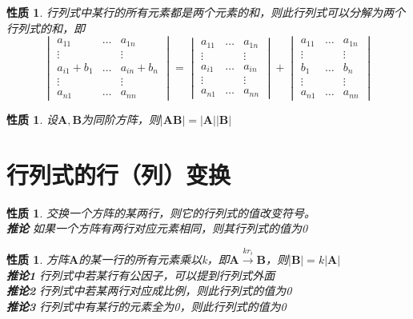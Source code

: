 \documentclass[12pt,oneside]{ctexbook}
\newtheorem{property}[subsection]{性质}
\begin{document}
\begin{property}
    行列式中某行的所有元素都是两个元素的和，则此行列式可以分解为两个行列式的和，即
    \[\begin{vmatrix}
        a_{11}&\dots&a_{1n}
        \\\vdots&&\vdots
        \\a_{i1}+b_1&\dots&a_{in}+b_n
        \\\vdots&&\vdots
        \\a_{n1}&\dots&a_{nn}
    \end{vmatrix}
    =\begin{vmatrix}
        a_{11}&\dots&a_{1n}
        \\\vdots&&\vdots
        \\a_{i1}&\dots&a_{in}
        \\\vdots&&\vdots
        \\a_{n1}&\dots&a_{nn}
    \end{vmatrix}+
    \begin{vmatrix}
        a_{11}&\dots&a_{1n}
        \\\vdots&&\vdots
        \\b_1&\dots&b_n
        \\\vdots&&\vdots
        \\a_{n1}&\dots&a_{nn}
    \end{vmatrix}\]
\end{property}
\begin{property}
    设\(\mathbf{A},\mathbf{B}\)为同阶方阵，则\(\rvert \mathbf{A}\mathbf{B} \rvert = \rvert\mathbf{A}\rvert\rvert \mathbf{B}\rvert\)
\end{property}

\section{行列式的行（列）变换}
\begin{property}
    交换一个方阵的某两行，则它的行列式的值改变符号。
    \\ \textbf{推论} 如果一个方阵有两行对应元素相同，则其行列式的值为0
\end{property}

\begin{property}
    方阵\(\mathbf{A}\)的某一行的所有元素乘以k，即\(\mathbf{A}\xrightarrow{kr_i}\mathbf{B}\)，则\(\rvert\mathbf{B}\rvert=k\rvert\mathbf{A}\rvert\)
    \\ \textbf{推论1} 行列式中若某行有公因子，可以提到行列式外面
    \\ \textbf{推论2} 行列式中若某两行对应成比例，则此行列式的值为0
    \\ \textbf{推论3} 行列式中有某行的元素全为0，则此行列式的值为0
\end{property}
\end{document}
